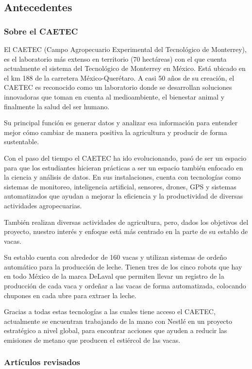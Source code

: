 \subsection{Antecedentes}

\subsubsection{Sobre el CAETEC}

El CAETEC (Campo Agropecuario Experimental del Tecnológico de Monterrey), es el laboratorio más extenso en territorio (70 hectáreas) con el que cuenta actualmente el sistema del Tecnológico de Monterrey en México. Está ubicado en el km 188 de la carretera México-Querétaro. A casi 50 años de su creación, el CAETEC es reconocido como un laboratorio donde se desarrollan soluciones innovadoras que toman en cuenta al medioambiente, el bienestar animal y finalmente la salud del ser humano.

Su principal función es generar datos y analizar esa información para entender mejor cómo cambiar de manera positiva la agricultura y producir de forma sustentable.

Con el paso del tiempo el CAETEC ha ido evolucionando, pasó de ser un espacio para que los estudiantes hicieran prácticas a ser un espacio también enfocado en la ciencia y análisis de datos. En sus instalaciones, cuenta con tecnologías como sistemas de monitoreo, inteligencia artificial, sensores, drones, GPS y sistemas automatizados que ayudan a mejorar la eficiencia y la productividad de diversas actividades agropecuarias.

También realizan diversas actividades de agricultura, pero, dados los objetivos del proyecto, nuestro interés y enfoque está más centrado en la parte de su establo de vacas.

Su establo cuenta con alrededor de 160 vacas y utilizan sistemas de ordeño automático para la producción de leche. Tienen tres de los cinco robots que hay en todo México de la marca DeLaval que permiten llevar un registro de la producción de cada vaca y ordeñar a las vacas de forma automatizada, colocando chupones en cada ubre para extraer la leche.

Gracias a todas estas tecnologías a las cuales tiene acceso el CAETEC, actualmente se encuentran trabajando de la mano con Nestlé en un proyecto estratégico a nivel global, para encontrar acciones que ayuden a reducir las emisiones de metano que producen el estiércol de las vacas.

\subsubsection{Artículos revisados}

